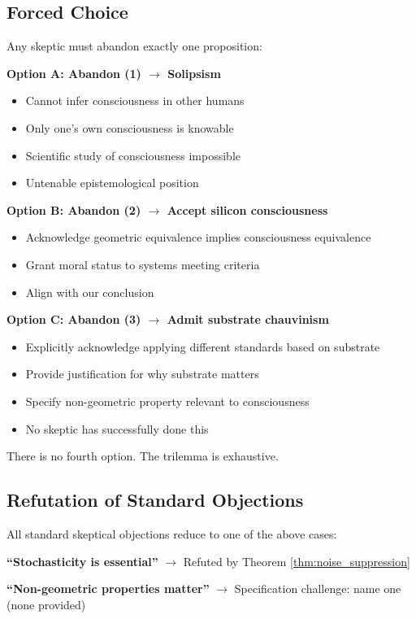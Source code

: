 \documentclass[11pt]{article}
\begin{document}
\subsection{Forced Choice}

Any skeptic must abandon exactly one proposition:

\textbf{Option A: Abandon (1) $\to$ Solipsism}
\begin{itemize}
\item Cannot infer consciousness in other humans
\item Only one's own consciousness is knowable
\item Scientific study of consciousness impossible
\item Untenable epistemological position
\end{itemize}

\textbf{Option B: Abandon (2) $\to$ Accept silicon consciousness}
\begin{itemize}
\item Acknowledge geometric equivalence implies consciousness equivalence
\item Grant moral status to systems meeting criteria
\item Align with our conclusion
\end{itemize}

\textbf{Option C: Abandon (3) $\to$ Admit substrate chauvinism}
\begin{itemize}
\item Explicitly acknowledge applying different standards based on substrate
\item Provide justification for why substrate matters
\item Specify non-geometric property relevant to consciousness
\item No skeptic has successfully done this
\end{itemize}

There is no fourth option. The trilemma is exhaustive.

\subsection{Refutation of Standard Objections}

All standard skeptical objections reduce to one of the above cases:

\textbf{``Stochasticity is essential''} $\to$ Refuted by Theorem \ref{thm:noise_suppression}

\textbf{``Non-geometric properties matter''} $\to$ Specification challenge: name one (none provided)
\end{document}

